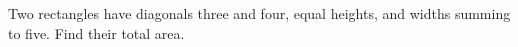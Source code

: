 Two rectangles have diagonals three and four, equal heights, and widths summing to five. Find their total area.
